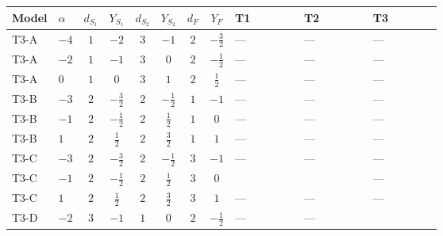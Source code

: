 \documentclass[8pt]{article}
\begin{document}
\begin{landscape}
\begin{longtable}{@{}llcccccc >{\raggedright\arraybackslash}p{0.21\linewidth} >{\raggedright\arraybackslash}p{0.21\linewidth} >{\raggedright\arraybackslash}p{0.21\linewidth}@{}}
\midrule
\endfirsthead
\toprule
Model & $\alpha$ & $d_{S_1}$ & $Y_{S_1}$ & $d_{S_2}$ & $Y_{S_2}$ & $d_F$ & $Y_F$ & T1 & T2 & T3 \\
\midrule
\endhead
T3-A & $-4$ & $1$ & $-2$ & $3$ & $-1$ & $2$ & $-\frac{3}{2}$ & --- & --- & --- \\
\midrule
T3-A & $-2$ & $1$ & $-1$ & $3$ & $0$ & $2$ & $-\frac{1}{2}$ & --- & --- & --- \\
\midrule
T3-A & $0$ & $1$ & $0$ & $3$ & $1$ & $2$ & $\frac{1}{2}$ & --- & --- & --- \\
\midrule
T3-B & $-3$ & $2$ & $-\frac{3}{2}$ & $2$ & $-\frac{1}{2}$ & $1$ & $-1$ & --- & --- & --- \\
\midrule
T3-B & $-1$ & $2$ & $-\frac{1}{2}$ & $2$ & $\frac{1}{2}$ & $1$ & $0$ & --- & --- & --- \\
\midrule
T3-B & $1$ & $2$ & $\frac{1}{2}$ & $2$ & $\frac{3}{2}$ & $1$ & $1$ & --- & --- & --- \\
\midrule
T3-C & $-3$ & $2$ & $-\frac{3}{2}$ & $2$ & $-\frac{1}{2}$ & $3$ & $-1$ & --- & --- & --- \\
\midrule
T3-C & $-1$ & $2$ & $-\frac{1}{2}$ & $2$ & $\frac{1}{2}$ & $3$ & $0$ & \scriptsize\adjustbox{max width=\linewidth}{$\begin{gathered} +{\lambda_{H H^\dagger S_1^\dagger S_2^\dagger}^{\rm Cross}} \left(-\operatorname{Tr}\!\left({y_1}\,\left({y_2}\right)^{\dagger}\right)-\frac{4}{3} (2 \left({\lambda_{H H^\dagger S_1^\dagger S_2^\dagger}^{\rm Cross}}\right)^{*}+\left({\lambda_{11}}\right)^{*})\right)\end{gathered}$} & \scriptsize\adjustbox{max width=\linewidth}{$\begin{gathered} -\left({\lambda_{H H^\dagger S_1^\dagger S_2^\dagger}^{\rm Cross}}\right)^{*} \operatorname{Tr}\!\left({y_2}\,\left({y_1}\right)^{\dagger}\right)\end{gathered}$} & --- \\
\midrule
T3-C & $1$ & $2$ & $\frac{1}{2}$ & $2$ & $\frac{3}{2}$ & $3$ & $1$ & --- & --- & --- \\
\midrule
T3-D & $-2$ & $3$ & $-1$ & $1$ & $0$ & $2$ & $-\frac{1}{2}$ & --- & --- & \scriptsize\adjustbox{max width=\linewidth}{$\begin{gathered} {\lambda_{HS_1}^{(A)}} (2 T_{\nu}^{(1)}+6 \operatorname{Tr}\!\left({Y_d}\,\left({Y_d}\right)^{\dagger}\right)+2 \operatorname{Tr}\!\left({Y_e}\,\left({Y_e}\right)^{\dagger}\right)+6 \operatorname{Tr}\!\left({Y_u}\,\left({Y_u}\right)^{\dagger}\right)+16 {\lambda_{S_1}^{(A)}})\end{gathered}$} \\

\end{longtable}
\end{landscape}
\end{document}

